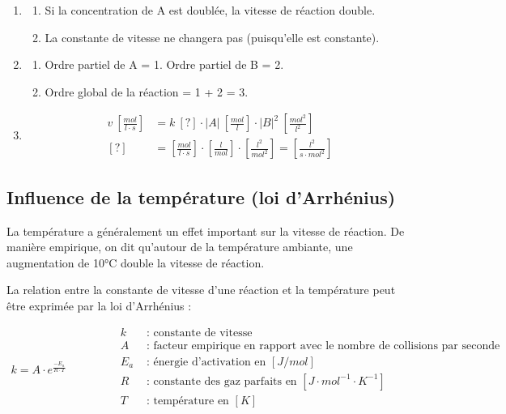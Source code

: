 \documentclass[
  11pt,
  a4paper,
  openany]{book}
\providecommand{\tightlist}{%
  \setlength{\itemsep}{0pt}\setlength{\parskip}{0pt}}
\begin{document}
\begin{Answer}

\begin{enumerate}
\def\labelenumi{\arabic{enumi}.}
\tightlist
\item
  \begin{enumerate}
  \def\labelenumii{\alph{enumii}.}
  \tightlist
  \item
    Si la concentration de A est doublée, la vitesse de réaction double.
  \item
    La constante de vitesse ne changera pas (puisqu'elle est constante).
  \end{enumerate}
\item
  \begin{enumerate}
  \def\labelenumii{\alph{enumii}.}
  \tightlist
  \item
    Ordre partiel de A = 1. Ordre partiel de B = 2.
  \item
    Ordre global de la réaction = 1 + 2 = 3.
  \end{enumerate}
\item
  \[
  \begin{split}
  v\ [\frac{mol}{l \cdot s}] &= k\ [?] \cdot |A|\ [\frac{mol}{l}] \cdot |B|^2 \ [\frac{mol^2}{l^2}] \\
  [?] &= [\frac{mol}{l \cdot s}] \cdot [\frac{l}{mol}] \cdot [\frac{l^2}{mol^2}] = [\frac{l^2}{s \cdot mol^2}]
  \end{split}
  \]
\end{enumerate}

\end{Answer}

\newpage

\subsection{Influence de la température (loi d'Arrhénius)}\label{influence-de-la-tempuxe9rature-loi-darrhuxe9nius}

La température a généralement un effet important sur la vitesse de réaction. De manière empirique, on dit qu'autour de la température ambiante, une augmentation de 10°C double la vitesse de réaction.

La relation entre la constante de vitesse d'une réaction et la température peut être exprimée par la loi d'Arrhénius :

\[
\begin{split}
k = A \cdot e^{\frac{-E_a}{R \cdot T}}
\end{split}
\qquad\qquad
\begin{split}
k &\text{ : constante de vitesse} \\
A &\text{ : facteur empirique en rapport avec le nombre de collisions par seconde } \\
E_a &\text{ : énergie d'activation en } [J/mol] \\
R &\text{ : constante des gaz parfaits en } [J \cdot mol^{-1} \cdot K^{-1}] \\
T &\text{ : température en } [K]
\end{split}
\]
\end{document}

